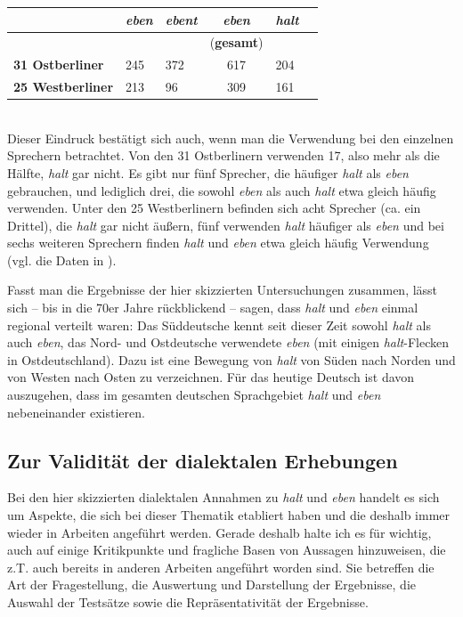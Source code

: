 \begin{exe}
	\ex\label{541} 
		\begin{tabular}[t]{|l|l|l:cx{1pt}l|} 
		\hline
 		& \textit{\textbf{eben}} & \textit{\textbf{ebent}} & \textit{\textbf{eben}} & \textit{\textbf{halt}}   \tabularnewline
 		\hline
 		& & & (\textbf{gesamt}) & \tabularnewline
 		\hline
 		\textbf{31 Ostberliner} & 245 & 372 & 617 & 204 \tabularnewline
 		\hline
 		\textbf{25 Westberliner} & 213 & 96 & 309 & 161 \tabularnewline
 		\hline
  		\end{tabular}			
\end{exe}	
 		\hfill\hbox {\citet[221]{Dittmar2000}}\\
Dieser Eindruck bestätigt sich auch, wenn man die Verwendung bei den einzelnen Sprechern betrachtet. Von den 31 Ostberlinern verwenden 17, also mehr als die Hälfte, \textit{halt} gar nicht. Es gibt nur fünf Sprecher, die häufiger \textit{halt} als \textit{eben} gebrauchen, und lediglich drei, die sowohl \textit{eben} als auch \textit{halt} etwa gleich häufig verwenden. Unter den 25 Westberlinern befinden sich acht Sprecher (ca. ein Drittel), die \textit{halt} gar nicht äußern, fünf verwenden \textit{halt} häufiger als \textit{eben} und bei sechs weiteren Sprechern finden \textit{halt} und \textit{eben} etwa gleich häufig Verwendung (vgl. die Daten in \citealt[121-122]{Dittmar2000}).

Fasst man die Ergebnisse der hier skizzierten Untersuchungen zusammen, lässt sich – bis in die 70er Jahre rückblickend – sagen, dass \textit{halt} und \textit{eben} einmal regional verteilt waren: Das Süddeutsche kennt seit dieser Zeit sowohl \textit{halt} als auch \textit{eben}, das Nord- und Ostdeutsche verwendete \textit{eben} (mit einigen \textit{halt}-Flecken in Ostdeutschland). Dazu ist eine Bewegung von \textit{halt} von Süden nach Norden und von Westen nach Osten zu verzeichnen. Für das heutige Deutsch ist davon auszugehen, dass im gesamten deutschen Sprachgebiet \textit{halt} und \textit{eben} nebeneinander existieren.

\subsection{Zur Validität der dialektalen Erhebungen}
\label{sec:val}
Bei den hier skizzierten dialektalen Annahmen zu \textit{halt} und \textit{eben} handelt es sich um Aspekte, die sich bei dieser Thematik etabliert haben und die deshalb immer wieder in Arbeiten angeführt werden. Gerade deshalb halte ich es für wichtig, auch auf einige Kritikpunkte und fragliche Basen von Aussagen hinzuweisen, die z.T. auch bereits in anderen Arbeiten angeführt worden sind. Sie betreffen die Art der Fragestellung, die Auswertung und Darstellung der Ergebnisse, die Auswahl der Testsätze sowie die Repräsentativität der Ergebnisse.

